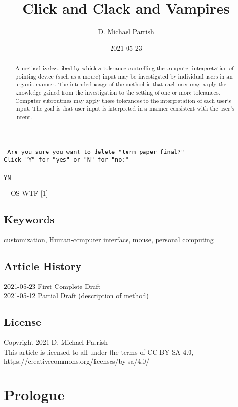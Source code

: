 \documentclass{article}
\title{Click and Clack and Vampires}
\author{D. Michael Parrish}
\date{2021-05-23}
\begin{document}
\maketitle

\begin{center}
\texttt{
Are you sure you want to delete "term\_paper\_final?"\\
Click "Y" for "yes" or "N" for "no:"\\
\phantom{M}\\
YN
}
\end{center}
\phantom{M} \hfill ---OS WTF [1]

\begin{abstract}
\noindent
A method is described by which a tolerance controlling the
computer interpretation of pointing device (such as a mouse)
input may be investigated by individual users in an organic
manner.
The intended usage of the method is that each user may apply
the knowledge gained from the investigation to the setting of
one or more tolerances.
Computer subroutines may apply these tolerances to
the interpretation of each user's input.
The goal is that user input is interpreted in a manner
consistent with the user's intent.
\end{abstract}

\subsection*{Keywords}

customization, Human-computer interface, mouse, personal computing

\subsection*{Article History}

2021-05-23 First Complete Draft\\
2021-05-12 Partial Draft (description of method)\\

\subsection*{License}

Copyright 2021 D. Michael Parrish\\
This article is licensed to all under the terms of CC BY-SA 4.0,\\
https://creativecommons.org/licenses/by-sa/4.0/

\section*{Prologue}
\end{document}
